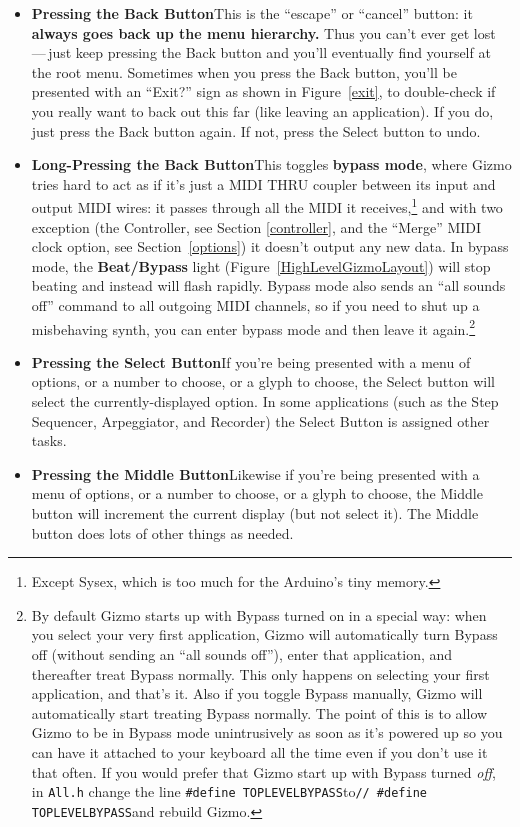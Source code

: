 \documentclass{article}
\begin{document}
\begin{itemize}
\item {\bf Pressing the Back Button}\quad This is the ``escape'' or ``cancel'' button: it {\bf always goes back up the menu hierarchy.}  Thus you can't ever get lost\,---\,just keep pressing the Back button and you'll eventually find yourself at the root menu.  Sometimes when you press the Back button, you'll be presented with an ``Exit?'' sign as shown in Figure~\ref{exit}, to double-check if you really want to back out this far (like leaving an application). If you do, just press the Back button again.  If not, press the Select button to undo.

\item {\bf Long-Pressing the Back Button}\quad This toggles {\bf bypass mode}, where Gizmo tries hard to act as if it's just a MIDI THRU coupler between its input and output MIDI wires: it passes through all the MIDI it receives,\footnote{Except Sysex, which is too much for the Arduino's tiny memory.} and with two exception (the Controller, see Section \ref{controller}, and the ``Merge'' MIDI clock option, see Section~\ref{options}) it doesn't output any new data.  In bypass mode, the {\bf Beat/Bypass} light (Figure~\ref{HighLevelGizmoLayout}) will stop beating and instead will flash rapidly.  Bypass mode also sends an ``all sounds off'' command to all outgoing MIDI channels, so if you need to shut up a misbehaving synth, you can enter bypass mode and then leave it again.\footnote{By default Gizmo starts up with Bypass turned on in a special way: when you select your very first application, Gizmo will automatically turn Bypass off (without sending an ``all sounds off''), enter that application, and thereafter treat Bypass normally.  This only happens on selecting your first application, and that's it.  Also if you toggle Bypass manually, Gizmo will automatically start treating Bypass normally.  The point of this is to allow Gizmo to be in Bypass mode unintrusively as soon as it's powered up so you can have it attached to your keyboard all the time even if you don't use it that often.  If you would prefer that Gizmo start up with Bypass turned {\it off}, in \texttt{All.h} change the line \texttt{\#define TOPLEVEL{\textunderscore}BYPASS}\quad to\quad\texttt{// \#define TOPLEVEL{\textunderscore}BYPASS}\quad and rebuild Gizmo.}

\item {\bf Pressing the Select Button}\quad If you're being presented with a menu of options, or a number to choose, or a glyph to choose, the Select button will select the currently-displayed option.  In some applications (such as the Step Sequencer, Arpeggiator, and Recorder) the Select Button is assigned other tasks.

\item {\bf Pressing the Middle Button}\quad Likewise if you're being presented with a menu of options, or a number to choose, or a glyph to choose, the Middle button will increment the current display (but not select it).   The Middle button does lots of other things as needed.
\end{itemize}
\end{document}
